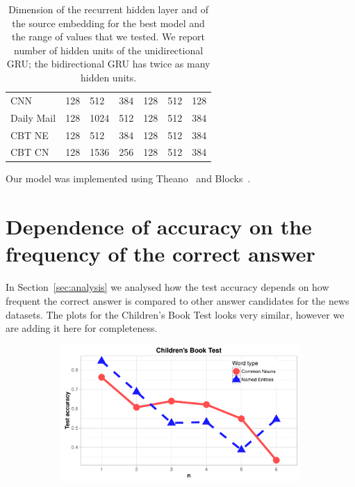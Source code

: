 \documentclass[11pt]{article}
\newcommand{\RUDA}[1]{{\color{black}#1}}
\newcommand{\RUDAA}[1]{{\color{black}#1}}
\begin{document}
\begin{appendices}
\begin{table}[ht]
{\begin{tabular}{l|lll|lll}
    \midrule
    
        CNN & 128 & 512 & 384 & 128 & 512 & 128 \\
        Daily Mail & 128 & 1024 & 512 & 128 & 512 & 384 \\
        CBT NE & 128 & 512 &384 & 128& 512 & 384 \\
        CBT CN& 128 & 1536 & 256 & 128 & 512 & 384 \\ 
     \bottomrule
  \end{tabular}
  }
  \caption{Dimension of the recurrent hidden layer and of the source embedding for the best model and the range of values that we tested. \RUDAA{We report number of hidden units of the unidirectional GRU; the bidirectional GRU has twice as many hidden units.}}
  \label{tab:params}

\end{table}

\RUDA{
Our model was implemented using Theano~\cite{Bastien-Theano-2012} and Blocks~\cite{VanMerrienboer2015}.
}


\section{Dependence of accuracy on the frequency of the correct answer}
\label{app:A}
In Section~\ref{sec:analysis} we analysed how the test accuracy depends on how frequent the correct answer is compared to other answer candidates for the news datasets. The plots for the Children's Book Test looks very similar, however we are adding it here for completeness.

\begin{figure} [hpb]
        \centering
        \begin{subfigure}[b]{0.475\textwidth}
            \centering
            \includegraphics[width=\textwidth]{CBT_nMostFreq_accuracy_line.pdf}
            \caption[]%
            {{}}    
            \label{fig:cbt_nMostFreq_graph}
        \end{subfigure}


\end{figure}
\end{appendices}
\end{document}
